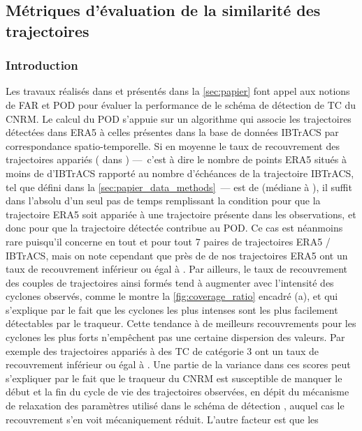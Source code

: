 \documentclass[../main.tex]{subfiles}
\begin{document}
\subsection{Métriques d'évaluation de la similarité des trajectoires}\label{sec:similarité}

\subsubsection*{Introduction}

Les travaux réalisés dans \textcite{dulac_assessing_2023} et présentés dans la \cref{sec:papier} font appel aux notions de FAR et POD pour évaluer la performance de
le schéma de détection de TC du CNRM. Le calcul du POD s'appuie sur un algorithme qui associe les trajectoires détectées dans ERA5 à celles présentes dans la
base de données IBTrACS par correspondance spatio-temporelle. Si en moyenne le taux de recouvrement des trajectoires appariés ( dans
\textcite{dulac_assessing_2023}) ---~c'est à dire le nombre de points ERA5 situés à moins de  d'IBTrACS rapporté au nombre d'échéances de la trajectoire
IBTrACS, tel que défini dans la \cref{sec:papier_data_methods}~--- est de  (médiane à ), il suffit dans l'absolu d'un seul pas de temps
remplissant la condition pour que la trajectoire ERA5 soit appariée à une trajectoire présente dans les observations, et donc pour que la trajectoire détectée
contribue au POD. Ce cas est néanmoins rare puisqu'il concerne en tout et pour tout \num{7} paires de trajectoires ERA5 / IBTrACS, mais on note cependant que
près de  de nos trajectoires ERA5 ont un taux de recouvrement inférieur ou égal à . Par ailleurs, le taux de recouvrement des couples de
trajectoires ainsi formés tend à augmenter avec l'intensité des cyclones observés, comme le montre la \cref{fig:coverage_ratio} encadré (a), et qui s'explique
par le fait que les cyclones les plus intenses sont les plus facilement détectables par le traqueur. Cette tendance à de meilleurs recouvrements pour les
cyclones les plus forts n'empêchent pas une certaine dispersion des valeurs. Par exemple  des trajectoires appariés à des TC de catégorie \num{3} ont un
taux de recouvrement inférieur ou égal à . Une partie de la variance dans ces scores peut s'expliquer par le fait que le traqueur du CNRM est
susceptible de manquer le début et la fin du cycle de vie des trajectoires observées, en dépit du mécanisme de relaxation des paramètres utilisé dans le schéma
de détection \parencite[][Figure 8]{bourdin_intercomparison_2022}, auquel cas le recouvrement s'en voit mécaniquement réduit. L'autre facteur est que les
\end{document}
